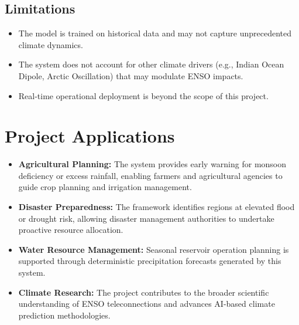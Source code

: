\subsection{Limitations}
\begin{itemize}
    \item The model is trained on historical data and may not capture unprecedented climate dynamics.
    \item The system does not account for other climate drivers (e.g., Indian Ocean Dipole, Arctic Oscillation) that may modulate ENSO impacts.
    \item Real-time operational deployment is beyond the scope of this project.
\end{itemize}

\section{Project Applications}
\begin{itemize}
    \item \textbf{Agricultural Planning:} The system provides early warning for monsoon deficiency or excess rainfall, enabling farmers and agricultural agencies to guide crop planning and irrigation management.

    \item \textbf{Disaster Preparedness:} The framework identifies regions at elevated flood or drought risk, allowing disaster management authorities to undertake proactive resource allocation.

    \item \textbf{Water Resource Management:} Seasonal reservoir operation planning is supported through deterministic precipitation forecasts generated by this system.

    \item \textbf{Climate Research:} The project contributes to the broader scientific understanding of ENSO teleconnections and advances AI-based climate prediction methodologies.
\end{itemize}

